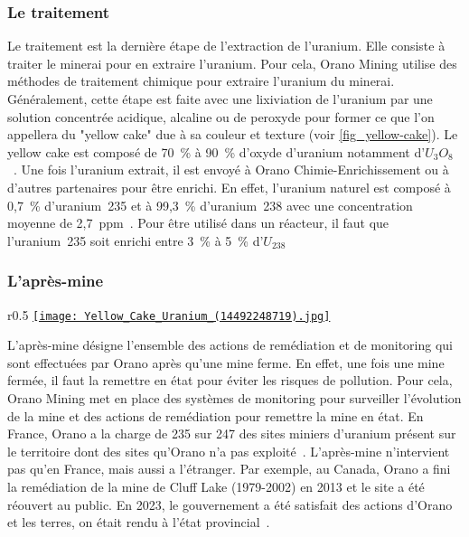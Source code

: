 \subsubsection{Le traitement}


Le traitement est la dernière étape de l'extraction de l'uranium. Elle consiste à traiter le minerai pour en extraire l'uranium. Pour cela, Orano Mining utilise des méthodes de traitement chimique pour extraire l'uranium du minerai. Généralement, cette étape est faite avec une lixiviation de l'uranium par une solution concentrée acidique, alcaline ou de peroxyde pour former ce que l'on appellera du "yellow cake" due à sa couleur et texture (voir \cref{fig_yellow-cake}). Le yellow cake est composé de 70~\% à 90~\% d'oxyde d'uranium notamment d'$U_3O_8$~\cite{article:composition-yellow-cake}. Une fois l'uranium extrait, il est envoyé à Orano Chimie-Enrichissement ou à d'autres partenaires pour être enrichi. En effet, l'uranium naturel est composé à 0,7~\% d'uranium~235 et à 99,3~\% d'uranium~238 avec une concentration moyenne de 2,7~ppm~\cite{site:natural_uranium}. Pour être utilisé dans un réacteur, il faut que l'uranium~235 soit enrichi entre 3~\% à 5~\% d'$U_{238}$~\cite{article:uranium-concentration}



\subsubsection{L'après-mine}
\begin{wrapfigure}{r}{0.5\textwidth}
    \centering
    \href{https://commons.wikimedia.org/wiki/File:Yellow_Cake_Uranium_(14492248719).jpg}{\texttt{[image: Yellow\_Cake\_Uranium\_(14492248719).jpg]}}
    \caption[Apparence du yellow cake]{Apparence de yellow cake. Avec des méthodes modernes, certains traitements peuvent lui donner une apparence marron, voir noir. Source~: \href{https://commons.wikimedia.org/wiki/File:Yellow_Cake_Uranium_(14492248719).jpg}{Nuclear Regulatory Commission from US}, Public domain, via Wikimedia Commons}
    \label{fig_yellow-cake}
\end{wrapfigure}
L'après-mine désigne l'ensemble des actions de remédiation et de monitoring qui sont effectuées par Orano après qu'une mine ferme. En effet, une fois une mine fermée, il faut la remettre en état pour éviter les risques de pollution. Pour cela, Orano Mining met en place des systèmes de monitoring pour surveiller l'évolution de la mine et des actions de remédiation pour remettre la mine en état. En France, Orano a la charge de 235 sur 247 des sites miniers d'uranium présent sur le territoire dont des sites qu'Orano n'a pas exploité~\cite{site:orano_apres_mine}. L'après-mine n'intervient pas qu'en France, mais aussi a l'étranger. Par exemple, au Canada, Orano a fini la remédiation de la mine de Cluff Lake (1979-2002) en 2013 et le site a été réouvert au public. En 2023, le gouvernement a été satisfait des actions d'Orano et les terres, on était rendu à l'état provincial~\cite{site:Cluff_lake_remediation}.



